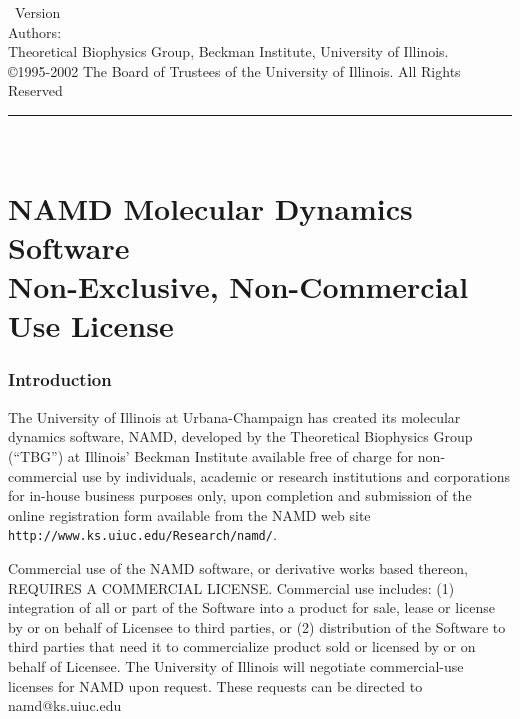 
\thispagestyle{empty}

\vspace*{0.1in}

\begin{centering}
{\LARGE \NAMD\ Version \NAMDVER}\\
\bigskip
{\large Authors: \NAMDAUTHORS} \\
\medskip
{\large Theoretical Biophysics Group, Beckman Institute, University of Illinois.} \\
\bigskip
{\large \copyright 1995-2002 The Board of Trustees of the University of Illinois.
All Rights Reserved} \\
\bigskip
\end{centering}

  \rule{6in}{0.04in}				\\	\vspace{0.25in}

\section*{NAMD Molecular Dynamics Software \\
Non-Exclusive, Non-Commercial Use License}

\subsubsection*{Introduction}

The University of Illinois at Urbana-Champaign has created its molecular
dynamics software, NAMD, developed by the Theoretical Biophysics 
Group (``TBG'') at Illinois' Beckman Institute available free of charge for
non-commercial use by individuals, academic or research institutions and
corporations for in-house business purposes only, upon completion and
submission of the online registration form available from the NAMD web
site {\tt http://www.ks.uiuc.edu/Research/namd/}.

Commercial use of the NAMD software, or derivative works based thereon,
REQUIRES A COMMERCIAL LICENSE. Commercial use includes: 
(1) integration of all or part of the Software into a product for sale, 
lease or license by or on behalf of Licensee to third parties, or 
(2) distribution of the Software to third parties that need it to 
commercialize product sold or licensed by or on behalf of Licensee.  
The University of Illinois will negotiate commercial-use licenses for 
NAMD upon request. These requests can be directed to namd@ks.uiuc.edu

